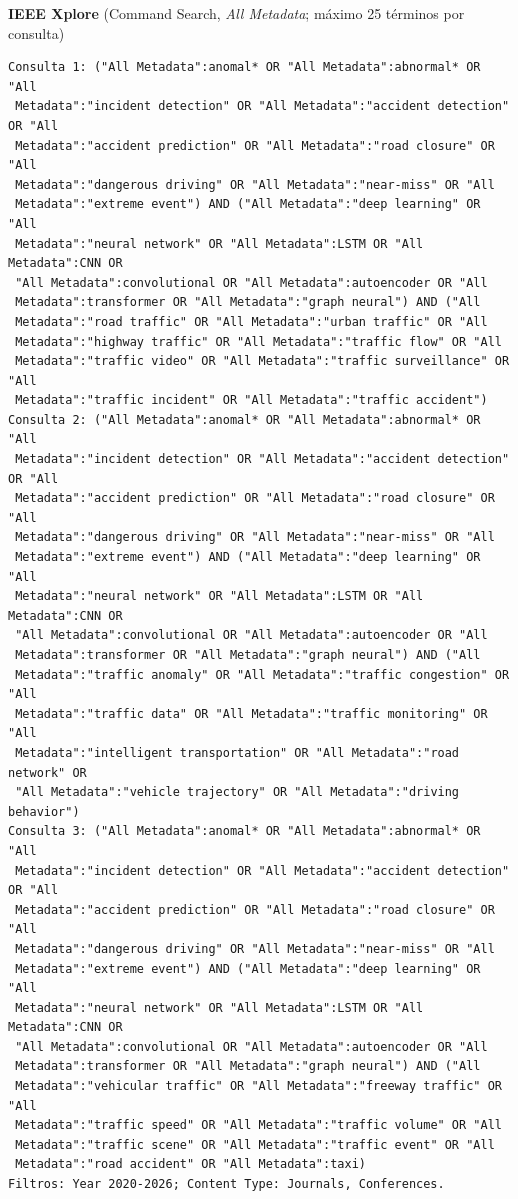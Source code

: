 \documentclass[12pt, a4paper]{article}
\begin{document}
{\noindent\textbf{IEEE Xplore} (Command Search, \textit{All Metadata}; m\'{a}ximo 25 t\'{e}rminos por consulta)
\begin{verbatim}
Consulta 1: ("All Metadata":anomal* OR "All Metadata":abnormal* OR "All
 Metadata":"incident detection" OR "All Metadata":"accident detection" OR "All
 Metadata":"accident prediction" OR "All Metadata":"road closure" OR "All
 Metadata":"dangerous driving" OR "All Metadata":"near-miss" OR "All
 Metadata":"extreme event") AND ("All Metadata":"deep learning" OR "All
 Metadata":"neural network" OR "All Metadata":LSTM OR "All Metadata":CNN OR
 "All Metadata":convolutional OR "All Metadata":autoencoder OR "All
 Metadata":transformer OR "All Metadata":"graph neural") AND ("All
 Metadata":"road traffic" OR "All Metadata":"urban traffic" OR "All
 Metadata":"highway traffic" OR "All Metadata":"traffic flow" OR "All
 Metadata":"traffic video" OR "All Metadata":"traffic surveillance" OR "All
 Metadata":"traffic incident" OR "All Metadata":"traffic accident")
Consulta 2: ("All Metadata":anomal* OR "All Metadata":abnormal* OR "All
 Metadata":"incident detection" OR "All Metadata":"accident detection" OR "All
 Metadata":"accident prediction" OR "All Metadata":"road closure" OR "All
 Metadata":"dangerous driving" OR "All Metadata":"near-miss" OR "All
 Metadata":"extreme event") AND ("All Metadata":"deep learning" OR "All
 Metadata":"neural network" OR "All Metadata":LSTM OR "All Metadata":CNN OR
 "All Metadata":convolutional OR "All Metadata":autoencoder OR "All
 Metadata":transformer OR "All Metadata":"graph neural") AND ("All
 Metadata":"traffic anomaly" OR "All Metadata":"traffic congestion" OR "All
 Metadata":"traffic data" OR "All Metadata":"traffic monitoring" OR "All
 Metadata":"intelligent transportation" OR "All Metadata":"road network" OR
 "All Metadata":"vehicle trajectory" OR "All Metadata":"driving behavior")
Consulta 3: ("All Metadata":anomal* OR "All Metadata":abnormal* OR "All
 Metadata":"incident detection" OR "All Metadata":"accident detection" OR "All
 Metadata":"accident prediction" OR "All Metadata":"road closure" OR "All
 Metadata":"dangerous driving" OR "All Metadata":"near-miss" OR "All
 Metadata":"extreme event") AND ("All Metadata":"deep learning" OR "All
 Metadata":"neural network" OR "All Metadata":LSTM OR "All Metadata":CNN OR
 "All Metadata":convolutional OR "All Metadata":autoencoder OR "All
 Metadata":transformer OR "All Metadata":"graph neural") AND ("All
 Metadata":"vehicular traffic" OR "All Metadata":"freeway traffic" OR "All
 Metadata":"traffic speed" OR "All Metadata":"traffic volume" OR "All
 Metadata":"traffic scene" OR "All Metadata":"traffic event" OR "All
 Metadata":"road accident" OR "All Metadata":taxi)
Filtros: Year 2020-2026; Content Type: Journals, Conferences.
\end{verbatim}

}
\end{document}
